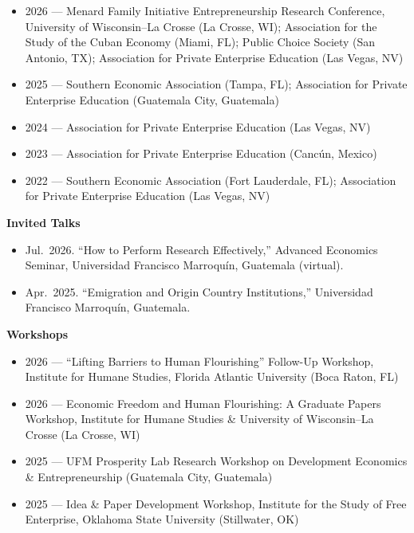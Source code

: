 \documentclass[11pt]{article}
\begin{document}
\begin{itemize}
    \item 2026 --- Menard Family Initiative Entrepreneurship Research Conference, University of Wisconsin--La Crosse (La Crosse, WI); Association for the Study of the Cuban Economy (Miami, FL); Public Choice Society (San Antonio, TX); Association for Private Enterprise Education (Las Vegas, NV)
    \item 2025 --- Southern Economic Association (Tampa, FL); Association for Private Enterprise Education (Guatemala City, Guatemala)
    \item 2024 --- Association for Private Enterprise Education (Las Vegas, NV)
    \item 2023 --- Association for Private Enterprise Education (Cancún, Mexico)
    \item 2022 --- Southern Economic Association (Fort Lauderdale, FL); Association for Private Enterprise Education (Las Vegas, NV)
\end{itemize}

\textbf{Invited Talks}

\begin{itemize}
    \item Jul.\ 2026. ``How to Perform Research Effectively,'' Advanced Economics Seminar, Universidad Francisco Marroquín, Guatemala (virtual).
    \item Apr.\ 2025. ``Emigration and Origin Country Institutions,'' Universidad Francisco Marroquín, Guatemala.
\end{itemize}

\textbf{Workshops}

\begin{itemize}
    \item 2026 --- ``Lifting Barriers to Human Flourishing'' Follow-Up Workshop, Institute for Humane Studies, Florida Atlantic University (Boca Raton, FL)
    \item 2026 --- Economic Freedom and Human Flourishing: A Graduate Papers Workshop, Institute for Humane Studies \& University of Wisconsin--La Crosse (La Crosse, WI)
    \item 2025 --- UFM Prosperity Lab Research Workshop on Development Economics \& Entrepreneurship (Guatemala City, Guatemala)
    \item 2025 --- Idea \& Paper Development Workshop, Institute for the Study of Free Enterprise, Oklahoma State University (Stillwater, OK)
\end{itemize}

\end{document}
